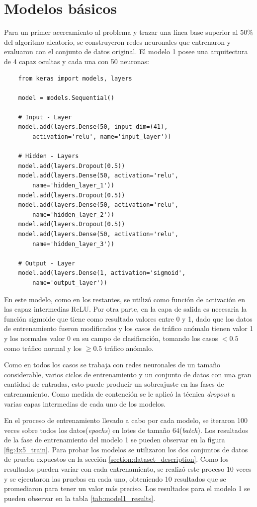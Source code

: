 \section{Modelos básicos}
Para un primer acercamiento al problema y trazar una línea base superior al 50\% del algoritmo aleatorio, se construyeron redes neuronales que entrenaron y evaluaron con el conjunto de datos original. El modelo 1 posee una arquitectura de 4 capaz ocultas y cada una con 50 neuronas:
\begin{verbatim}
    from keras import models, layers

    model = models.Sequential()

    # Input - Layer
    model.add(layers.Dense(50, input_dim=(41), 
        activation='relu', name='input_layer'))

    # Hidden - Layers
    model.add(layers.Dropout(0.5))
    model.add(layers.Dense(50, activation='relu', 
        name='hidden_layer_1'))
    model.add(layers.Dropout(0.5))
    model.add(layers.Dense(50, activation='relu', 
        name='hidden_layer_2'))
    model.add(layers.Dropout(0.5))
    model.add(layers.Dense(50, activation='relu', 
        name='hidden_layer_3'))

    # Output - Layer
    model.add(layers.Dense(1, activation='sigmoid', 
        name='output_layer'))
\end{verbatim}

En este modelo, como en los restantes, se utilizó como función de activación en las capaz intermedias ReLU. Por otra parte, en la capa de salida es necesaria la función sigmoide que tiene como resultado valores entre 0 y 1, dado que los datos de entrenamiento fueron modificados y los casos de tráfico anómalo tienen valor 1 y los normales valor 0 en su campo de clasificación, tomando los casos $< 0.5$ como tráfico normal y los $\geq 0.5$ tráfico anómalo.

Como en todos los casos se trabaja con redes neuronales de un tamaño considerable, varios ciclos de entrenamiento y un conjunto de datos con una gran cantidad de entradas, esto puede producir un sobreajuste en las fases de entrenamiento. Como medida de contención se le aplicó la técnica \textit{dropout} a varias capas intermedias de cada uno de los modelos.

En el proceso de entrenamiento llevado a cabo por cada modelo, se iteraron 100 veces sobre todos los datos(\textit{epochs}) en lotes de tamaño 64(\textit{batch}). Los resultados de la fase de entrenamiento del modelo 1 se pueden observar en la figura \ref{fig:4x5_train}. Para probar los modelos se utilizaron los dos conjuntos de datos de prueba expuestos en la sección \ref{section:dataset_description}. Como los resultados pueden variar con cada entrenamiento, se realizó este proceso 10 veces y se ejecutaron las pruebas en cada uno, obteniendo 10 resultados que se promediaron para tener un valor m\'as preciso. Los resultados para el modelo 1 se pueden observar en la tabla \ref{tab:model1_results}.

